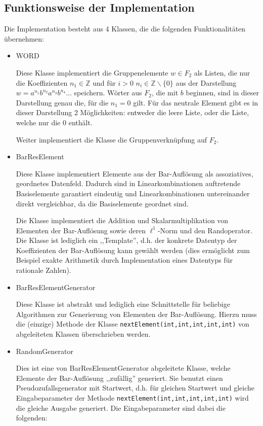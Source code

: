 \documentclass[a4paper,twoside,10pt]{scrreprt}
\newcommand{\Z}{\mathbb{Z}}
\theoremstyle{definition}
\begin{document}
\subsection*{Funktionsweise der Implementation}
Die Implementation besteht aus 4 Klassen, die die folgenden Funktionalitäten übernehmen:
\begin{itemize}
\item WORD\par
Diese Klasse implementiert die Gruppenelemente $w\in F_2$ als Listen, die nur die Koeffizienten $n_1\in \Z$ und für $i>0$ $n_i\in \Z\backslash\{0\}$ aus der Darstellung $w=a^{n_1}b^{n_2}a^{n_3}b^{n_4}\ldots$ speichern. Wörter aus $F_2$, die mit $b$ beginnen, sind in dieser Darstellung genau die, für die $n_1=0$ gilt. Für das neutrale Element gibt es in dieser Darstellung 2 Möglichkeiten: entweder die leere Liste, oder die Liste, welche nur die $0$ enthält.\par
Weiter implementiert die Klasse die Gruppenverknüpfung auf $F_2$.
\item BarResElement\par
Diese Klasse implementiert Elemente aus der Bar-Auflösung als assoziatives, geordnetes Datenfeld. Dadurch sind in Linearkombinationen auftretende Basiselemente garantiert eindeutig und Linearkombinationen untereinander direkt vergleichbar, da die Basiselemente geordnet sind.\par
Die Klasse implementiert die Addition und Skalarmultiplikation von Elementen der Bar-Auflösung sowie deren $\ell^1$-Norm und den Randoperator. Die Klasse ist lediglich ein ,,Template'', d.h. der konkrete Datentyp der Koeffizienten der Bar-Auflösung kann gewählt werden (dies ermöglicht zum Beispiel exakte Arithmetik durch Implementation eines Datentyps für rationale Zahlen).
\item BarResElementGenerator\par
Diese Klasse ist abstrakt und lediglich eine Schnittstelle für beliebige Algorithmen zur Generierung von Elementen der Bar-Auflösung. Hierzu muss die (einzige) Methode der Klasse \lstinline|nextElement(int,int,int,int,int)| von abgeleiteten Klassen überschrieben werden.
\item RandomGenerator\par
Dies ist eine von BarResElementGenerator abgeleitete Klasse, welche Elemente der Bar-Auflösung ,,zufällig'' generiert. Sie benutzt einen Pseudozufallsgenerator mit Startwert, d.h. für gleichen Startwert und gleiche Eingabeparameter der Methode \lstinline|nextElement(int,int,int,int,int)| wird die gleiche Ausgabe generiert. Die Eingabeparameter sind dabei die folgenden:

\end{itemize}
\end{document}
